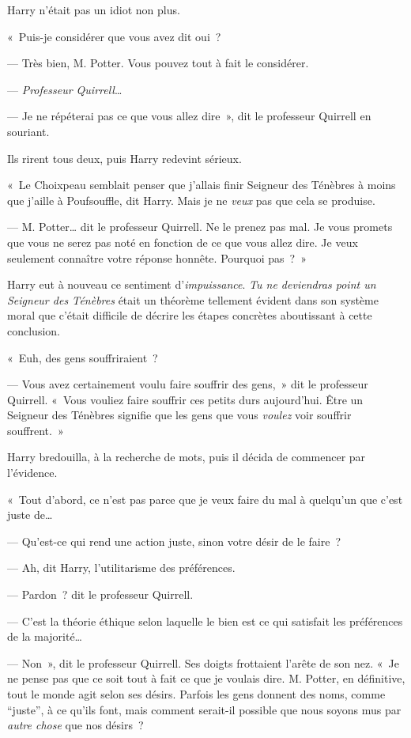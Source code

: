 Harry n'était pas un idiot non plus.

«~Puis-je considérer que vous avez dit oui~?

--- Très bien, M. Potter. Vous pouvez tout à fait le considérer.

--- \emph{Professeur Quirrell}…

--- Je ne répéterai pas ce que vous allez dire~», dit le professeur Quirrell en souriant.

Ils rirent tous deux, puis Harry redevint sérieux.

«~Le Choixpeau semblait penser que j'allais finir Seigneur des Ténèbres à moins que j'aille à Poufsouffle, dit Harry. Mais je ne \emph{veux} pas que cela se produise.

--- M. Potter… dit le professeur Quirrell. Ne le prenez pas mal. Je vous promets que vous ne serez pas noté en fonction de ce que vous allez dire. Je veux seulement connaître votre réponse honnête. Pourquoi pas~?~»

Harry eut à nouveau ce sentiment d'\emph{impuissance}. \emph{Tu ne deviendras point un Seigneur des Ténèbres} était un théorème tellement évident dans son système moral que c'était difficile de décrire les étapes concrètes aboutissant à cette conclusion.

«~Euh, des gens souffriraient~?

--- Vous avez certainement voulu faire souffrir des gens,~» dit le professeur Quirrell. «~Vous vouliez faire souffrir ces petits durs aujourd'hui. Être un Seigneur des Ténèbres signifie que les gens que vous \emph{voulez} voir souffrir souffrent.~»

Harry bredouilla, à la recherche de mots, puis il décida de commencer par l'évidence.

«~Tout d'abord, ce n'est pas parce que je veux faire du mal à quelqu'un que c'est juste de…

--- Qu'est-ce qui rend une action juste, sinon votre désir de le faire~?

--- Ah, dit Harry, l'utilitarisme des préférences.

--- Pardon~? dit le professeur Quirrell.

--- C'est la théorie éthique selon laquelle le bien est ce qui satisfait les préférences de la majorité…

--- Non~», dit le professeur Quirrell. Ses doigts frottaient l'arête de son nez. «~Je ne pense pas que ce soit tout à fait ce que je voulais dire. M. Potter, en définitive, tout le monde agit selon ses désirs. Parfois les gens donnent des noms, comme “juste”, à ce qu'ils font, mais comment serait-il possible que nous soyons mus par \emph{autre chose} que nos désirs~?

